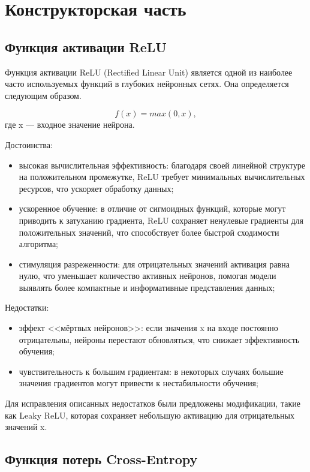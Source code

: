 \chapter{Конструкторская часть}


\section{Функция активации ReLU}

Функция активации ReLU (Rectified Linear Unit) является одной из наиболее часто используемых функций в глубоких нейронных сетях. Она определяется следующим образом.

\begin{equation}
	f(x) = max(0, x),
\end{equation}
где x — входное значение нейрона.

Достоинства:
\begin{itemize}[label*=---]
	\item высокая вычислительная эффективность: благодаря своей линейной структуре на положительном промежутке, ReLU требует минимальных вычислительных ресурсов, что ускоряет обработку данных;
	\item ускоренное обучение: в отличие от сигмоидных функций, которые могут приводить к затуханию градиента, ReLU сохраняет ненулевые градиенты для положительных значений, что способствует более быстрой сходимости алгоритма;
	\item стимуляция разреженности: для отрицательных значений активация равна нулю, что уменьшает количество активных нейронов, помогая модели выявлять более компактные и информативные представления данных;
\end{itemize}

Недостатки:
\begin{itemize}[label*=---]
	\item эффект <<мёртвых нейронов>>: если значения x на входе постоянно отрицательны, нейроны перестают обновляться, что снижает эффективность обучения;
	\item чувствительность к большим градиентам: в некоторых случаях большие значения градиентов могут привести к нестабильности обучения;
\end{itemize}
Для исправления описанных недостатков были предложены модификации, такие как Leaky ReLU, которая сохраняет небольшую активацию для отрицательных значений x.



\section{Функция потерь Cross-Entropy}

